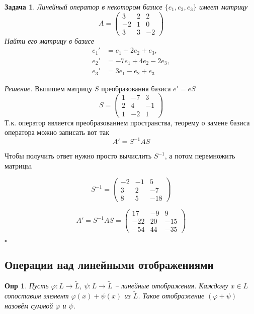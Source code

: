 \documentclass[a4paper,12pt]{article}
\newtheorem*{definition}{Опр}
\newtheorem*{prob}{Задача}
\newenvironment{soln}{\noindent\textit{Решение.}}{\hfill$\square$}
\begin{document}
\begin{prob}
	Линейный оператор в некотором базисе $\{e_1, e_2, e_3\}$ имеет матрицу
	\[
		A = \begin{pmatrix}
			3 & 2 & 2 \\
			-2 & 1 &0 \\
			3 & 3 & -2
		\end{pmatrix}
	\]
	Найти его матрицу в базисе 
	\begin{align*}
		e_1' &= e_1 + 2e_2 + e_3, \\
		e_2' &= -7e_1 + 4e_2 - 2e_3, \\
		e_3' &= 3e_1 - e_2 + e_3		
	\end{align*}	
\end{prob}

\begin{soln}
	Выпишем матрицу $S$ преобразования базиса $e' = eS$
	\[
		S = \begin{pmatrix}
			1 & -7 &  3 \\
			2 &  4 & -1 \\
			1 & -2 &  1
		\end{pmatrix}
	\]
	Т.к. оператор является преобразованием пространства, теорему о замене базиса оператора можно записать вот так
	\[
		A' = S^{-1} A S
	\]
	
	Чтобы получить ответ нужно просто вычислить $S^{-1}$, а потом перемножить матрицы.
	
	\[
		S^{-1} = \begin{pmatrix}
			-2 & -1 &  5 \\
			3 &  2 & -7 \\
			8 & 5 &  -18
		\end{pmatrix}
	\]
	
	\[
		A' = S^{-1} A S = 
		\begin{pmatrix}
			17 & -9 &  9 \\
			-22 & 20 & -15 \\
			-54 & 44 &  -35
		\end{pmatrix}
	\]
	
\end{soln}

\subsection{Операции над линейными отображениями}
\begin{definition}
	Пусть $\varphi: L \to \tilde{L}$, $\psi: L \to \tilde{L}$ -- линейные отображения. Каждому $x \in L$ сопоставим элемент $\varphi(x) + \psi(x)$ из $\tilde{L}$. Такое отображение $(\varphi + \psi)$ назовём суммой $\varphi$ и $\psi$.
\end{definition}
\end{document}
